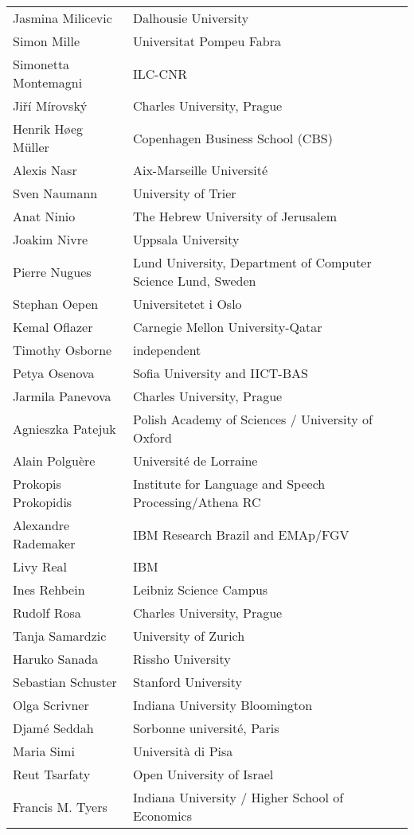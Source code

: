 \documentclass{easychair}
\begin{document}
\begin{longtable}{p{}p{}}
Jasmina Milicevic & Dalhousie University\\
Simon Mille & Universitat Pompeu Fabra\\
Simonetta Montemagni & ILC-CNR\\
Ji\v{r}\'i M\'irovsk\'y & Charles University, Prague\\
Henrik H{\o}eg M\"uller & Copenhagen Business School (CBS)\\
Alexis Nasr & Aix-Marseille Universit\'e\\
Sven Naumann & University of Trier\\
Anat Ninio & The Hebrew University of Jerusalem\\
Joakim Nivre & Uppsala University\\
Pierre Nugues & Lund University, Department of Computer Science Lund, Sweden\\
Stephan Oepen & Universitetet i Oslo\\
Kemal Oflazer & Carnegie Mellon University-Qatar\\
Timothy Osborne & independent\\
Petya Osenova & Sofia University and IICT-BAS\\
Jarmila Panevova & Charles University, Prague\\
Agnieszka Patejuk & Polish Academy of Sciences / University of Oxford\\
Alain Polgu\`ere & Universit\'e de Lorraine\\
Prokopis Prokopidis & Institute for Language and Speech Processing/Athena RC\\
Alexandre Rademaker & IBM Research Brazil and EMAp/FGV\\
Livy Real & IBM\\
Ines Rehbein & Leibniz Science Campus\\
Rudolf Rosa & Charles University, Prague\\
Tanja Samardzic & University of Zurich\\
Haruko Sanada & Rissho University\\
Sebastian Schuster & Stanford University\\
Olga Scrivner & Indiana University Bloomington\\
Djam\'e Seddah & Sorbonne universit\'e, Paris\\
Maria Simi & Universit\`a di Pisa\\
Reut Tsarfaty & Open University of Israel\\
Francis M. Tyers & Indiana University / Higher School of Economics\\

\end{longtable}
\end{document}
